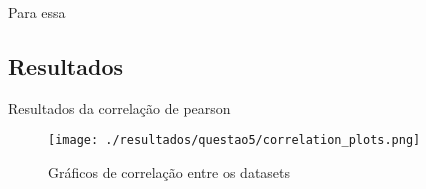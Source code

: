 \documentclass{article}
\begin{document}
Para essa

\subsection{Resultados}

\begin{table}
	\centering
	
	\caption{Resultados da correlação de pearson}
	\label{tab:questao5-resultados-correlacao}
\end{table}


\begin{figure}
	\centering
	\caption{Gráficos de correlação entre os datasets}
	\texttt{[image: ./resultados/questao5/correlation\_plots.png]}
	\label{fig:questao5-scatter-plots}
\end{figure}
\end{document}
